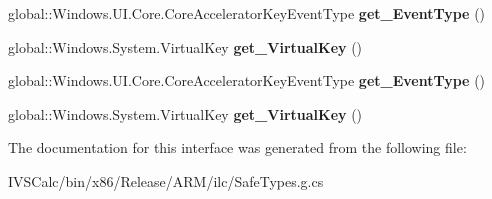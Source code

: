 \begin{DoxyCompactItemize}
global\+::\+Windows.\+U\+I.\+Core.\+Core\+Accelerator\+Key\+Event\+Type {\bfseries get\+\_\+\+Event\+Type} ()
\item 
\mbox{\label{interface_windows_1_1_u_i_1_1_core_1_1_i_accelerator_key_event_args_a11db28446dfab78bff980c1ef18b85f6}} 
global\+::\+Windows.\+System.\+Virtual\+Key {\bfseries get\+\_\+\+Virtual\+Key} ()
\item 
\mbox{\label{interface_windows_1_1_u_i_1_1_core_1_1_i_accelerator_key_event_args_a36825eed5be3040532c09697b74e7e2f}} 
global\+::\+Windows.\+U\+I.\+Core.\+Core\+Accelerator\+Key\+Event\+Type {\bfseries get\+\_\+\+Event\+Type} ()
\item 
\mbox{\label{interface_windows_1_1_u_i_1_1_core_1_1_i_accelerator_key_event_args_a11db28446dfab78bff980c1ef18b85f6}} 
global\+::\+Windows.\+System.\+Virtual\+Key {\bfseries get\+\_\+\+Virtual\+Key} ()
\end{DoxyCompactItemize}


The documentation for this interface was generated from the following file\+:\begin{DoxyCompactItemize}
\item 
I\+V\+S\+Calc/bin/x86/\+Release/\+A\+R\+M/ilc/Safe\+Types.\+g.\+cs\end{DoxyCompactItemize}
